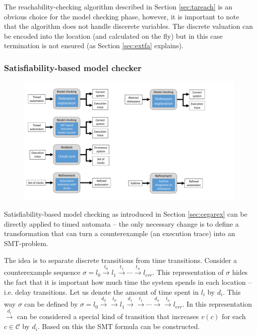 The reachability-checking algorithm described in Section \ref{sec:tareach} is an obvious choice for the model checking phase, however, it is important to note that the algorithm does not handle discerete variables. The discrete valuation can be encoded into the location (and calculated on the fly) but in this case termination is not ensured (as Section \ref{sec:extfa} explains).

\subsubsection{Satisfiability-based model checker}\label{sec:satmc}

\begin{figure}[h]
	\centering
	\includegraphics[width=.7\textwidth]{include/figures/modules_ta_mc_sat}
\end{figure}

Satisfiability-based model checking as introduced in Section \ref{sec:cegarex} can be directly applied to timed automata -- the only necessary change is to define a transformation that can turn a counterexample (an execution trace) into an SMT-problem.

The idea is to separate discrete transitions from time transitions. Consider a counterexample sequence $\sigma = l_0 \xrightarrow{t_0} l_1 \xrightarrow{t_1} \cdots \xrightarrow{t_n} l_{err}$.  This representation of $\sigma$ hides the fact that it is important how much time the system spends in each location -- i.e. delay transitions. Let us denote the amount of time spent in $l_i$ by $d_i$. This way $\sigma$ can be defined by $\sigma = l_0 \xrightarrow{d_0} \xrightarrow{t_0} l_1 \xrightarrow{d_1} \xrightarrow{t_1} \cdots \xrightarrow{d_n} \xrightarrow{t_n} l_{err}$. In this representation $\xrightarrow{d_i}$ can be considered a special kind of transition that increases $v(c)$ for each $c \in \mathcal{C}$ by $d_i$. Based on this the SMT formula can be constructed.

